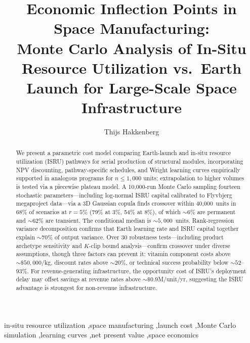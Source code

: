 \documentclass[preprint,12pt]{elsarticle}
\begin{document}
\begin{frontmatter}

\title{Economic Inflection Points in Space Manufacturing:\\ Monte Carlo Analysis of In-Situ Resource Utilization vs.\ Earth Launch for Large-Scale Space Infrastructure}

\author[dyson]{Thijs Hakkenberg}

\address[dyson]{Project Dyson, Open Research Initiative}

\begin{abstract}
We present a parametric cost model comparing Earth-launch and in-situ resource utilization (ISRU) pathways for serial production of structural modules, incorporating NPV discounting, pathway-specific schedules, and Wright learning curves empirically supported in analogous programs for $n \leq 1{,}000$ units; extrapolation to higher volumes is tested via a piecewise plateau model. A 10{,}000-run Monte Carlo sampling fourteen stochastic parameters---including log-normal ISRU capital calibrated to Flyvbjerg megaproject data---via a 3D Gaussian copula finds crossover within 40{,}000~units in 68\% of scenarios at $r = 5\%$ (79\% at 3\%, 54\% at 8\%), of which ${\sim}6\%$ are permanent and ${\sim}62\%$ are transient. The conditional median is ${\sim}5{,}000$~units. Rank-regression variance decomposition confirms that Earth learning rate and ISRU capital together explain ${\sim}70\%$ of output variance. Over 30 robustness tests---including product archetype sensitivity and $K$-clip bound analysis---confirm crossover under diverse assumptions, though three factors can prevent it: vitamin component costs above ${\sim}\$50{,}000$/kg, discount rates above ${\sim}20\%$, or technical success probability below ${\sim}52$--$93\%$. For revenue-generating infrastructure, the opportunity cost of ISRU's deployment delay may offset savings at revenue rates above ${\sim}\$0.9$M/unit/yr, suggesting the ISRU advantage is strongest for non-revenue infrastructure.
\end{abstract}

\begin{keyword}
in-situ resource utilization \sep space manufacturing \sep launch cost \sep Monte Carlo simulation \sep learning curves \sep net present value \sep space economics
\end{keyword}

\end{frontmatter}
\end{document}
